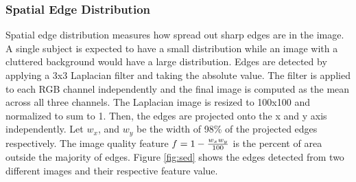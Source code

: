 \documentclass[conference,a4paper]{IEEEtran}
\begin{document}
  \subsubsection{Spatial Edge Distribution}
  Spatial edge distribution measures how spread out sharp edges are in the image.  A single subject is expected to have a small distribution while an image with a cluttered background would have a large distribution.  Edges are detected by applying a 3x3 Laplacian filter and taking the absolute value.  The filter is applied to each RGB channel independently and the final image is computed as the mean across all three channels.  The Laplacian image is resized to 100x100 and normalized to sum to 1.  Then, the edges are projected onto the x and y axis independently.  Let $w_x$, and $w_y$ be the width of 98\% of the projected edges respectively.  The image quality feature $f = 1 - {w_x w_y \over 100}$ is the percent of area outside the majority of edges.  Figure \ref{fig:sed} shows the edges detected from two different images and their respective feature value.
\end{document}
